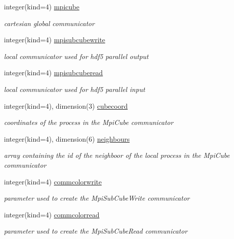 \begin{DoxyCompactItemize}
integer(kind=4) \hyperlink{classmodmpicom_a85f71373d318b169e73b6a0221dc62f1}{mpicube}
\begin{DoxyCompactList}\small\item\em cartesian global communicator \end{DoxyCompactList}\item 
integer(kind=4) \hyperlink{classmodmpicom_aa950234af9f6bdf930d8c4e61a76ca96}{mpisubcubewrite}
\begin{DoxyCompactList}\small\item\em local communicator used for hdf5 parallel output \end{DoxyCompactList}\item 
integer(kind=4) \hyperlink{classmodmpicom_afee5305bd782226daffc69f8db2af8a7}{mpisubcuberead}
\begin{DoxyCompactList}\small\item\em local communicator used for hdf5 parallel input \end{DoxyCompactList}\item 
integer(kind=4), dimension(3) \hyperlink{classmodmpicom_a533718abb8ce3f03b430dfbf9f821069}{cubecoord}
\begin{DoxyCompactList}\small\item\em coordinates of the process in the Mpi\-Cube communicator \end{DoxyCompactList}\item 
integer(kind=4), dimension(6) \hyperlink{classmodmpicom_a818e6dbfc3705e5d5bddb752f2aeb5aa}{neighbours}
\begin{DoxyCompactList}\small\item\em array containing the id of the neighboor of the local process in the Mpi\-Cube communicator \end{DoxyCompactList}\item 
integer(kind=4) \hyperlink{classmodmpicom_a10897435b88ede934389b5099b4a2f7f}{commcolorwrite}
\begin{DoxyCompactList}\small\item\em parameter used to create the Mpi\-Sub\-Cube\-Write communicator \end{DoxyCompactList}\item 
integer(kind=4) \hyperlink{classmodmpicom_a0ba0397b7d92b456e11a65bce1f86e7c}{commcolorread}
\begin{DoxyCompactList}\small\item\em parameter used to create the Mpi\-Sub\-Cube\-Read communicator \end{DoxyCompactList}\item 

\end{DoxyCompactItemize}
